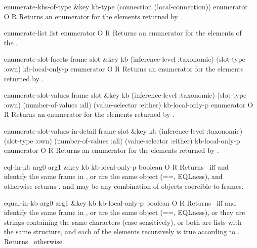 \begin{okbcop}{enumerate-kbs-of-type}{ \&key kb-type (connection (local-connection))} { enumerator } { O } { R } {  }
Returns an enumerator for the elements returned by 
.
\end{okbcop}

\begin{okbcop}{enumerate-list}{ list} { enumerator } { O } { R } {  }
Returns an enumerator for the elements of the .
\end{okbcop}

\begin{okbcop}{enumerate-slot-facets}{ frame slot \&key kb (inference-level :taxonomic) (slot-type :own) kb-local-only-p} { enumerator } { O } { R } {  }
Returns an enumerator for the elements returned by 
.
\end{okbcop}

\begin{okbcop}{enumerate-slot-values}{ frame slot \&key kb (inference-level :taxonomic) (slot-type :own) (number-of-values :all) (value-selector :either) kb-local-only-p} { enumerator } { O } { R } {  }
Returns an enumerator for the elements returned by 
.
\end{okbcop}

\begin{okbcop}{enumerate-slot-values-in-detail}{ frame slot \&key kb (inference-level :taxonomic) (slot-type :own) (number-of-values :all) (value-selector :either) kb-local-only-p} { enumerator } { O } { R } {  }
Returns an enumerator for the elements returned by 
.
\end{okbcop}

\begin{okbcop}{eql-in-kb}{ arg0 arg1 \&key kb kb-local-only-p} { boolean } { O } { R } {  }
Returns \true\ iff  and 
   identify the same frame in , or are the same object (==, EQLness),
   and otherwise returns \false.
    and  may be any combination of objects coercible
   to frames.
\end{okbcop}

\begin{okbcop}{equal-in-kb}{ arg0 arg1 \&key kb kb-local-only-p} { boolean } { O } { R } {  }
Returns \true\ iff  and 
   identify the same frame in , or are the same object (==, EQLness),
   or they are strings containing the same characters (case sensitively), or
   both are lists with the same structure, and each of the elements
   recursively is true according to .  Returns \false\
   otherwise.
\end{okbcop}

